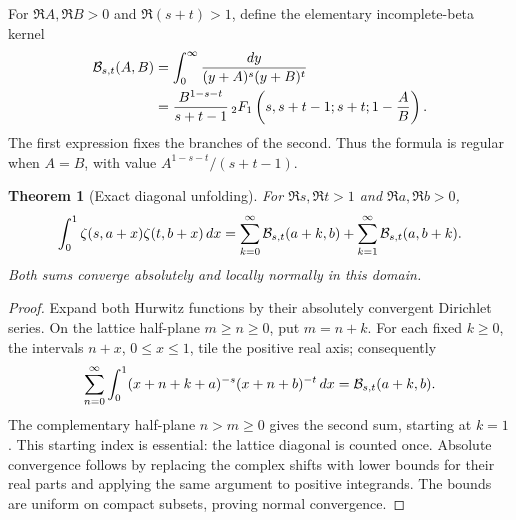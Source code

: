 \documentclass[11pt,letterpaper]{article}
\numberwithin{equation}{section}
\newtheorem{theorem}{Theorem}[section]
\theoremstyle{definition}
\theoremstyle{remark}
\begin{document}
For $\Re A,\Re B>0$ and $\Re(s+t)>1$, define the elementary
incomplete-beta kernel
\begin{align}
 \mathcal B_{s,t}(A,B)
 &=\int_0^\infty\frac{dy}{(y+A)^s(y+B)^t}\notag\\
 &=\frac{B^{1-s-t}}{s+t-1}\,
 {}_2F_1\left(s,s+t-1;s+t;1-\frac AB\right).
 \label{gs:beta-kernel}
\end{align}
The first expression fixes the branches of the second.  Thus the
formula is regular when $A=B$, with value
$A^{1-s-t}/(s+t-1)$.

\begin{theorem}[Exact diagonal unfolding]\label{gs:unfolding}
For $\Re s,\Re t>1$ and $\Re a,\Re b>0$,
\begin{equation}\label{gs:unfolded}
 \int_0^1\zeta(s,a+x)\zeta(t,b+x)\,dx
 =\sum_{k=0}^\infty\mathcal B_{s,t}(a+k,b)
  +\sum_{k=1}^\infty\mathcal B_{s,t}(a,b+k).
\end{equation}
Both sums converge absolutely and locally normally in this domain.
\end{theorem}

\begin{proof}
Expand both Hurwitz functions by their absolutely convergent Dirichlet
series.  On the lattice half-plane $m\ge n\ge0$, put $m=n+k$.
For each fixed $k\ge0$, the intervals $n+x$, $0\le x\le1$, tile the
positive real axis; consequently
\[
 \sum_{n=0}^\infty\int_0^1
 (x+n+k+a)^{-s}(x+n+b)^{-t}\,dx
 =\mathcal B_{s,t}(a+k,b).
\]
The complementary half-plane $n>m\ge0$ gives the second sum, starting
at $k=1$.  This starting index is essential: the lattice diagonal is
counted once.  Absolute convergence follows by replacing the complex
shifts with lower bounds for their real parts and applying the same
argument to positive integrands.  The bounds are uniform on compact
subsets, proving normal convergence.
\end{proof}
\end{document}
